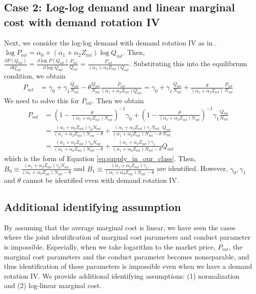 \documentclass[11pt, a4paper]{article}
\begin{document}
\subsection{Case 2: Log-log demand and linear marginal cost with demand rotation IV}
Next, we consider the log-log demand with demand rotation IV as in \cite{bresnahan1982oligopoly}.
$\log P_{mt}=\alpha_0+(\alpha_1+\alpha_2 Z_{mt}) \log Q_{mt}$. Then, $\frac{\partial P\left(Q_{m t}\right)}{\partial Q_{mt}}=\frac{\partial \log P\left(Q_{m t}\right)}{\partial \log Q_{mt}}\frac{P_{mt}}{Q_{mt}}=\frac{P_{mt}}{(\alpha_1+\alpha_2 Z_{mt}) Q_{mt}}$. Substituting this into the equilibrium condition, we obtain
    \begin{align}
        P_{m t}&=\gamma_0+\gamma_1 \frac{Q_{mt}}{N_{mt}}-\theta \frac{Q_{mt}}{N_{mt}}\frac{P_{mt}}{(\alpha_1+\alpha_2 Z_{mt}) Q_{mt}}=\gamma_0+\gamma_1 \frac{Q_{mt}}{N_{mt}}+ \frac{\theta}{(\alpha_1+\alpha_2 Z_{mt})}\frac{P_{mt}}{N_{mt}}
    \end{align}
    We need to solve this for $P_{mt}$. Then we obtain
    \begin{align*}
        P_{m t}&=\left(1-\frac{\theta}{(\alpha_1+\alpha_2 Z_{mt}) N_{mt}}\right)^{-1}\gamma_0+\left(1-\frac{\theta}{(\alpha_1+\alpha_2 Z_{mt}) N_{mt}}\right)^{-1}\gamma_1 \frac{Q_{mt}}{N_{mt}}\\
        & =\frac{(\alpha_1+\alpha_2 Z_{mt}) \gamma_0 N_{mt}}{(\alpha_1+\alpha_2 Z_{mt}) N_{mt}-\theta}+\frac{(\alpha_1+\alpha_2 Z_{mt}) \gamma_1 N_{mt}}{(\alpha_1+\alpha_2 Z_{mt}) N_{mt}-\theta} \frac{Q_{mt}}{N_{mt}}\\
        &=\frac{(\alpha_1+\alpha_2 Z_{mt}) \gamma_0 N_{mt}}{(\alpha_1+\alpha_2 Z_{mt}) N_{mt}-\theta}+\frac{(\alpha_1+\alpha_2 Z_{mt}) \gamma_1}{(\alpha_1+\alpha_2 Z_{mt}) N_{mt}-\theta} Q_{mt}
    \end{align*}
    which is the form of Equation \eqref{eq:supply_in_our_class}.
    Then, $B_0 \equiv \frac{(\alpha_1+\alpha_2 Z_{mt}) \gamma_0 N_{mt}}{(\alpha_1+\alpha_2 Z_{mt}) N_{mt}-\theta}$ and $B_1\equiv\frac{(\alpha_1+\alpha_2 Z_{mt}) \gamma_1}{(\alpha_1+\alpha_2 Z_{mt}) N_{mt}-\theta}$ are identified. However, $\gamma_0,\gamma_1$ and $\theta$ cannot be identified even with demand rotation IV.



\subsection{Additional identifying assumption}

By assuming that the average marginal cost is linear, we have seen the cases where the joint identification of marginal cost parameters and conduct parameter is impossible.
Especially, when we take logarithm to the market price, $P_{mt}$, the marginal cost parameters and the conduct parameter becomes nonseparable, and thus identification of these parameters is impossible even when we have a demand rotation IV. We provide additional identifying assumptions: (1) normalization and (2) log-linear marginal cost.
\end{document}
